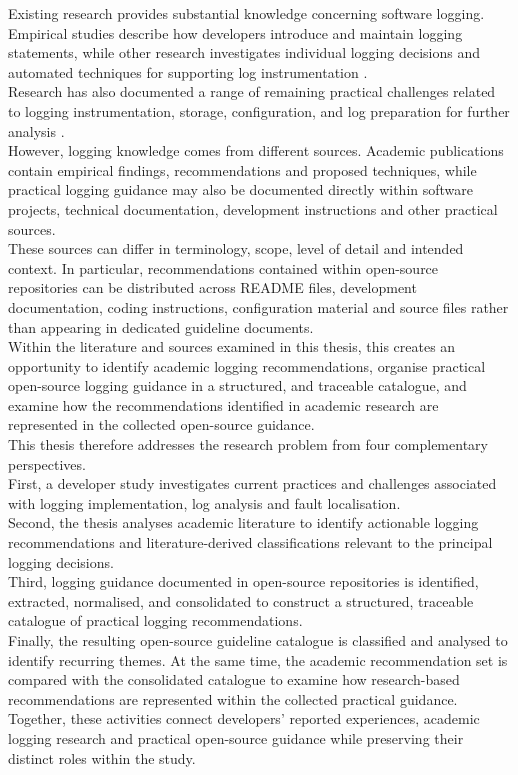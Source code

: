 Existing research provides substantial knowledge concerning software logging. 
Empirical studies describe how developers introduce and maintain logging statements, 
while other research investigates individual logging decisions and automated techniques 
for supporting log instrumentation \cite{chen2021asurveyofsoftwareloginstrumentation,gu2023loggingpracticesinsoftwareengineering}.
\\
Research has also documented a range of remaining practical challenges related 
to logging instrumentation, storage, configuration, and log preparation for further analysis \cite{batoun2024aliteraturereview}.
\\
However, logging knowledge comes from different sources. Academic publications contain
empirical findings, recommendations and proposed techniques, while practical logging guidance may
also be documented directly within software projects, technical documentation, development instructions
and other practical sources.
\\
These sources can differ in terminology, scope, level of detail and intended context. 
In particular, recommendations contained within open-source repositories can be distributed across README files,
development documentation, coding instructions, configuration material and source files rather 
than appearing in dedicated guideline documents.
\\
Within the literature and sources examined in this thesis, this creates an opportunity to identify academic logging recommendations,
organise practical open-source logging guidance in a structured, and traceable catalogue,
and examine how the recommendations identified in academic research are represented in the collected open-source guidance.
\\
This thesis therefore addresses the research problem from four complementary perspectives.
\\
First, a developer study investigates current practices and challenges associated
with logging implementation, log analysis and fault localisation.
\\
Second, the thesis analyses academic literature to identify actionable logging recommendations
and literature-derived classifications relevant to the principal logging decisions.
\\
Third, logging guidance documented in open-source repositories is identified, 
extracted, normalised, and consolidated to construct a structured, traceable catalogue of practical logging recommendations.
\\
Finally, the resulting open-source guideline catalogue is classified and analysed to identify recurring themes.
At the same time, the academic recommendation set is compared with the consolidated catalogue to examine how research-based
recommendations are represented within the collected practical guidance.
\\
Together, these activities connect developers' reported experiences, 
academic logging research and practical open-source guidance while preserving their distinct roles within the study.

